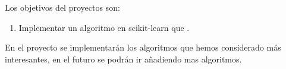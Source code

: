 Los objetivos del proyectos son:

\begin{enumerate}
\item Implementar un algoritmo en scikit-learn que .
\end{enumerate}

En el proyecto se implementarán los algoritmos que hemos considerado más interesantes, en el futuro se podrán ir añadiendo mas algoritmos.

